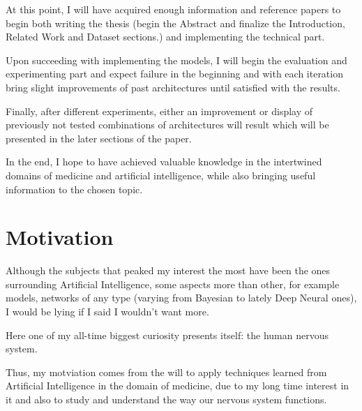 \documentclass[a4paper]{article} %
\begin{document}
At this point, I will have acquired enough information and reference papers to begin both writing the thesis (begin the
Abstract and finalize the Introduction, Related Work and Dataset sections.) and implementing the technical part.

Upon succeeding with implementing the models, I will begin the evaluation and experimenting part and expect failure in
the beginning and with each iteration bring slight improvements of past architectures until satisfied with the results.

Finally, after different experiments, either an improvement or display of previously not tested combinations of
architectures will result which will be presented in the later sections of the paper.

In the end, I hope to have achieved valuable knowledge in the intertwined domains of medicine and artificial intelligence,
while also bringing useful information to the chosen topic.

\section{Motivation}
Although the subjects that peaked my interest the most have been the ones surrounding Artificial Intelligence,
some aspects more than other, for example models, networks of any type (varying from Bayesian to lately Deep Neural ones),
I would be lying if I said I wouldn't want more.

Here one of my all-time biggest curiosity presents itself: the human nervous system.

Thus, my motviation comes from the will to apply techniques learned from Artificial Intelligence in the domain of medicine,
due to my long time interest in it and also to study and understand the way our nervous system functions.
\end{document}
